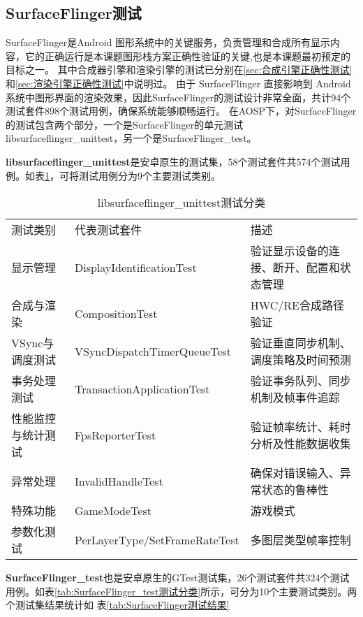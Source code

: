 \subsection{SurfaceFlinger测试}

SurfaceFlinger是Android 图形系统中的关键服务，负责管理和合成所有显示内容，它的正确运行是本课题图形栈方案正确性验证的关键,也是本课题最初预定的目标之一。
其中合成器引擎和渲染引擎的测试已分别在\ref{sec:合成引擎正确性测试}和\ref{sec:渲染引擎正确性测试}中说明过。
由于 SurfaceFlinger 直接影响到 Android 系统中图形界面的渲染效果，因此SurfaceFlinger的测试设计非常全面，共计94个测试套件898个测试用例，确保系统能够顺畅运行。
在AOSP下，对SurfaceFlinger的测试包含两个部分，一个是SurfaceFlinger的单元测试libsurfaceflinger\_unittest，另一个是SurfaceFlinger\_test。

\textbf{libsurfaceflinger\_unittest}是安卓原生的测试集，58个测试套件共574个测试用例。如表\ref{tab:libsurfaceflinger_unittest测试分类}，可将测试用例分为9个主要测试类别。

\begin{table}[H]
    \centering
    \caption{libsurfaceflinger\_unittest测试分类}
    \label{tab:libsurfaceflinger_unittest测试分类}
    \begin{tabular}{lll}
        \toprule
        测试类别 & 代表测试套件	& 描述 \\
        显示管理 & DisplayIdentificationTest & 验证显示设备的连接、断开、配置和状态管理 \\
        合成与渲染 & CompositionTest & HWC/RE合成路径验证 \\
        VSync与调度测试 & VSyncDispatchTimerQueueTest & 验证垂直同步机制、调度策略及时间预测 \\
        事务处理测试 & TransactionApplicationTest & 验证事务队列、同步机制及帧事件追踪 \\
        性能监控与统计测试 & FpsReporterTest & 验证帧率统计、耗时分析及性能数据收集 \\
        异常处理 & InvalidHandleTest & 确保对错误输入、异常状态的鲁棒性 \\
        特殊功能 & GameModeTest & 游戏模式 \\  
        参数化测试 &  PerLayerType/SetFrameRateTest & 多图层类型帧率控制 \\
        \bottomrule
    \end{tabular}
    \note{}
\end{table}

\textbf{SurfaceFlinger\_test}也是安卓原生的GTest测试集，26个测试套件共324个测试用例。如表\ref{tab:SurfaceFlinger_test测试分类}所示，可分为10个主要测试类别。两个测试集结果统计如
表\ref{tab:SurfaceFlinger测试结果}

